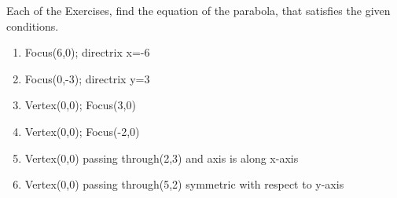 Each of the Exercises, find the equation of the parabola, that satisfies the given conditions.

\begin{enumerate}[label=\thesection.\arabic*,ref=\thesection.\theenumi,resume*]
\item Focus(6,0); directrix x=-6 
\item Focus(0,-3); directrix y=3
\item Vertex(0,0); Focus(3,0)
\item Vertex(0,0); Focus(-2,0) 
\item Vertex(0,0) passing through(2,3) and axis is along x-axis
\item Vertex(0,0) passing through(5,2) symmetric with respect to y-axis
\end{enumerate}
